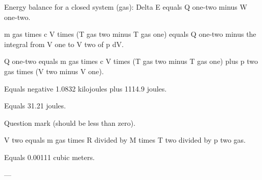Energy balance for a closed system (gas):  
Delta E equals Q one-two minus W one-two.  

m gas times c V times (T gas two minus T gas one) equals Q one-two minus the integral from V one to V two of p dV.  

Q one-two equals m gas times c V times (T gas two minus T gas one) plus p two gas times (V two minus V one).  

Equals negative 1.0832 kilojoules plus 1114.9 joules.  

Equals 31.21 joules.  

Question mark (should be less than zero).  

V two equals m gas times R divided by M times T two divided by p two gas.  

Equals 0.00111 cubic meters.  

---